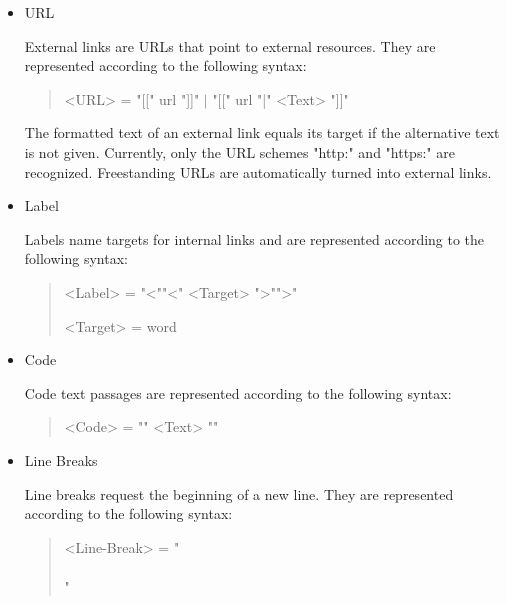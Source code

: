 \begin{itemize}
\item URL\nopagebreak

External links are URLs that point to external resources.
They are represented according to the following syntax:

\begin{quote}\begin{grammar}
<URL> = "[[" url "]]" $\mid$ "[[" url "|" <Text> "]]" \par
\end{grammar}\end{quote}

The formatted text of an external link equals its target if the alternative text is not given.
Currently, only the URL schemes "http:" and "https:" are recognized.
Freestanding URLs are automatically turned into external links.

\item Label\nopagebreak

Labels name targets for internal links and are represented according to the following syntax:

\begin{quote}\begin{grammar}
<Label> = "<""<" <Target> ">"">" \par
<Target> = word \par
\end{grammar}\end{quote}

\item Code\nopagebreak

Code text passages are represented according to the following syntax:

\begin{quote}\begin{grammar}
<Code> = "{{{" <Text> "}}}" \par
\end{grammar}\end{quote}

\item Line Breaks\nopagebreak

Line breaks request the beginning of a new line.
They are represented according to the following syntax:

\begin{quote}\begin{grammar}
<Line-Break> = "\\\\" \par
\end{grammar}\end{quote}

\end{itemize}


